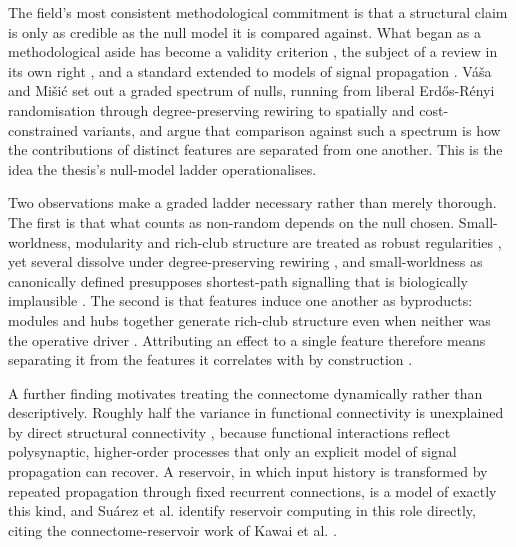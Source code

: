 The field's most consistent methodological commitment is that a structural claim is only
as credible as the null model it is compared against. What began as a methodological
aside \cite{bassett2017network} has become a validity criterion \cite{bassett2018nature},
the subject of a review in its own right \cite{vavsa2022null}, and a standard extended to
models of signal propagation \cite{seguin2023brain}. Váša and Mišić \cite{vavsa2022null}
set out a graded spectrum of nulls, running from liberal Erdős-Rényi randomisation through
degree-preserving rewiring to spatially and cost-constrained variants, and argue that
comparison against such a spectrum is how the contributions of distinct features are
separated from one another. This is the idea the thesis's null-model ladder
operationalises.
 
Two observations make a graded ladder necessary rather than merely thorough. The first is
that what counts as non-random depends on the null chosen. Small-worldness, modularity and
rich-club structure are treated as robust regularities \cite{bassett2017network}, yet
several dissolve under degree-preserving rewiring \cite{vavsa2022null}, and small-worldness
as canonically defined presupposes shortest-path signalling that is biologically
implausible \cite{seguin2023brain}. The second is that features induce one another as
byproducts: modules and hubs together generate rich-club structure even when neither was
the operative driver \cite{vavsa2022null}. Attributing an effect to a single feature
therefore means separating it from the features it correlates with by construction
\cite{bassett2018nature, suarez2020linking}.
 
A further finding motivates treating the connectome dynamically rather than descriptively.
Roughly half the variance in functional connectivity is unexplained by direct structural
connectivity \cite{suarez2020linking, seguin2023brain}, because functional interactions
reflect polysynaptic, higher-order processes that only an explicit model of signal
propagation can recover. A reservoir, in which input history is transformed by repeated
propagation through fixed recurrent connections, is a model of exactly this kind, and
Suárez et al. \cite{suarez2020linking} identify reservoir computing in this role directly,
citing the connectome-reservoir work of Kawai et al. \cite{kawai2019small}.
 
